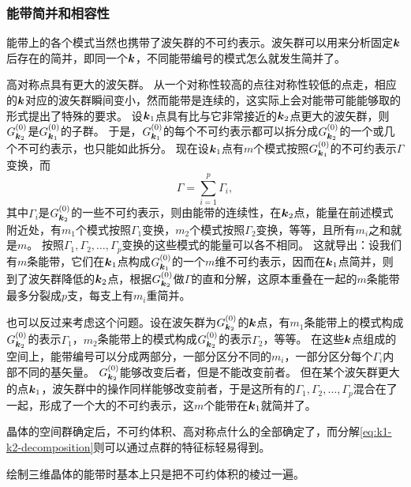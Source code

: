 \subsubsection{能带简并和相容性}\label{sec:energy-band-consist}

能带上的各个模式当然也携带了波矢群的不可约表示。波矢群可以用来分析固定$\vb*{k}$后存在的简并，即同一个$\vb*{k}$，不同能带编号的模式怎么就发生简并了。

高对称点具有更大的波矢群。
从一个对称性较高的点往对称性较低的点走，相应的$\vb*{k}$对应的波矢群瞬间变小，然而能带是连续的，这实际上会对能带可能能够取的形式提出了特殊的要求。
设$\vb*{k}_1$点具有比与它非常接近的$\vb*{k}_2$点更大的波矢群，则$G_{\vb*{k}_2}^{(0)}$是$G_{\vb*{k}_1}^{(0)}$的子群。
于是，$G_{\vb*{k}_1}^{(0)}$的每个不可约表示都可以拆分成$G_{\vb*{k}_2}^{(0)}$的一个或几个不可约表示，也只能如此拆分。
现在设$\vb*{k}_1$点有$m$个模式按照$G_{\vb*{k}_1}^{(0)}$的不可约表示$\Gamma$变换，而
\begin{equation}
    \Gamma = \sum_{i=1}^p \Gamma_i,
    \label{eq:k1-k2-decomposition}
\end{equation}
其中$\Gamma_i$是$G_{\vb*{k}_2}^{(0)}$的一些不可约表示，则由能带的连续性，在$\vb*{k}_2$点，能量在前述模式附近处，有$m_1$个模式按照$\Gamma_1$变换，$m_2$个模式按照$\Gamma_2$变换，等等，且所有$m_i$之和就是$m$。
按照$\Gamma_1, \Gamma_2, \ldots, \Gamma_p$变换的这些模式的能量可以各不相同。
这就导出：设我们有$m$条能带，它们在$\vb*{k}_1$点构成$G_{\vb*{k}_1}^{(0)}$的一个$m$维不可约表示，因而在$\vb*{k}_1$点简并，则到了波矢群降低的$\vb*{k}_2$点，根据$G_{\vb*{k}_2}^{(0)}$做$\Gamma$的直和分解，这原本重叠在一起的$m$条能带最多分裂成$p$支，每支上有$m_i$重简并。

也可以反过来考虑这个问题。设在波矢群为$G_{\vb*{k}_2}^{(0)}$的$\vb*{k}$点，有$m_1$条能带上的模式构成$G_{\vb*{k}_2}^{(0)}$的表示$\Gamma_1$，$m_2$条能带上的模式构成$G_{\vb*{k}_2}^{(0)}$的表示$\Gamma_2$，等等。
在这些$\vb*{k}$点组成的空间上，能带编号可以分成两部分，一部分区分不同的$m_i$，一部分区分每个$\Gamma_i$内部不同的基矢量。
$G_{\vb*{k}_2}^{(0)}$能够改变后者，但是不能改变前者。
但在某个波矢群更大的点$\vb*{k}_1$，波矢群中的操作同样能够改变前者，于是这所有的$\Gamma_1, \Gamma_2, \ldots, \Gamma_p$混合在了一起，形成了一个大的不可约表示，这$m$个能带在$\vb*{k}_1$就简并了。

晶体的空间群确定后，不可约体积、高对称点什么的全部确定了，而分解\eqref{eq:k1-k2-decomposition}则可以通过点群的特征标轻易得到。

绘制三维晶体的能带时基本上只是把不可约体积的棱过一遍。